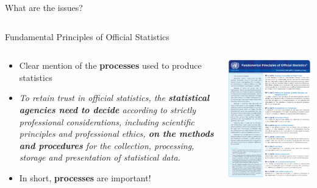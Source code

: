 \documentclass[xcolor=x11names,compress]{beamer}
\renewcommand{\(}{\begin{columns}}
\renewcommand{\)}{\end{columns}}
\newcommand{\<}[1]{\begin{column}{#1}}
\renewcommand{\>}{\end{column}}
\begin{document}
\begin{frame}{What are the issues?}
\begin{columns}[T]
\begin{column}{0.5\textwidth}
\begin{itemize}
         \end{itemize}
    \end{column}
  \end{columns}
\end{frame}

\begin{frame}{Fundamental Principles of Official Statistics}
  \begin{columns}[T]
    \begin{column}{0.6\textwidth}
      \begin{itemize}[<+->]
        \item Clear mention of the \textbf{processes} used to produce statistics
        \item \emph{To retain trust in official statistics, the \textbf{statistical agencies need to decide} according to strictly professional considerations, including scientific principles and professional ethics, \textbf{on the methods and procedures} for the collection, processing, storage and presentation of statistical data.}
      \item In short, \textbf{processes} are important!
      \end{itemize}
    \end{column}
    \begin{column}{0.4\textwidth}
      \includegraphics[width=\textwidth]{FundamentalPrinciplesOS.PNG}

\end{column}
\end{columns}
\end{frame}
\end{document}
